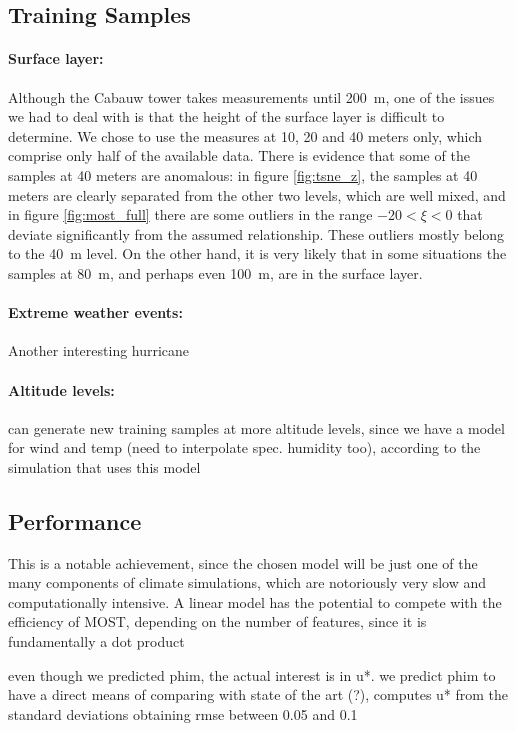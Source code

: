 \documentclass[a4paper]{book}
\begin{document}
\subsection{Training Samples}

\paragraph{Surface layer:} Although the Cabauw tower takes measurements until \SI{200}{\meter}, one of the issues we had to deal with is that the height of the surface layer is difficult to determine. We chose to use the measures at 10, 20 and 40 meters only, which comprise only half of the available data. There is evidence that some of the samples at 40 meters are anomalous: in figure \ref{fig:tsne_z}, the samples at 40 meters are clearly separated from the other two levels, which are well mixed, and in figure \ref{fig:most_full} there are some outliers in the range $-20<\xi<0$ that deviate significantly from the assumed relationship. These outliers mostly belong to the \SI{40}{\meter} level. On the other hand, it is very likely that in some situations the samples at \SI{80}{\meter}, and perhaps even \SI{100}{\meter}, are in the surface layer.

\paragraph{Extreme weather events:} Another interesting 
hurricane

\paragraph{Altitude levels:} can generate new training samples at more altitude levels, since we have a model for wind and temp (need to interpolate spec. humidity too), according to the simulation that uses this model


\subsection{Performance}
This is a notable achievement, since the chosen model will be just one of the many components of climate simulations, which are notoriously very slow and computationally intensive. A linear model has the potential to compete with the efficiency of MOST, depending on the number of features, since it is fundamentally a dot product

even though we predicted phim, the actual interest is in u*. we predict phim to have a direct means of comparing with state of the art (?), \cite{weber1999} computes u* from the standard deviations obtaining rmse between 0.05 and 0.1
\end{document}
